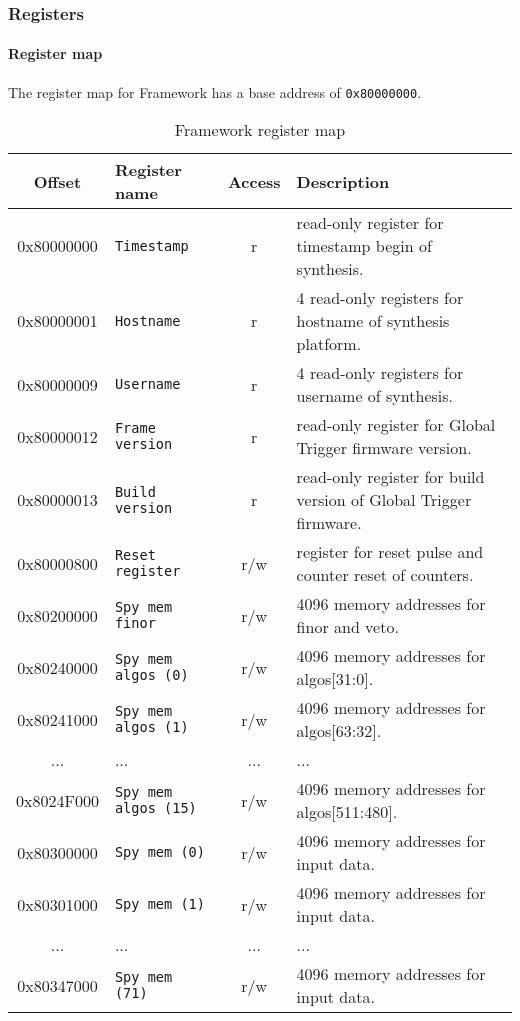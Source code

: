 \subsubsection{Registers}
\label{sec:framework:registers}

\paragraph{Register map}
\label{sec:framework:reg_map}
The register map for Framework has a base address of \verb|0x80000000|.

\begin{longtable}{c p{} c p{}}
\caption{Framework register map}\\
\hline
Offset & Register name & Access & Description\\
\hline
\hline
\endhead
0x80000000 & \verb|Timestamp| & r & read-only register for timestamp begin of synthesis.\\
0x80000001 & \verb|Hostname| & r & 4 read-only registers for hostname of synthesis platform.\\
0x80000009 & \verb|Username| & r & 4 read-only registers for username of synthesis.\\
0x80000012 & \verb|Frame version| & r & read-only register for Global Trigger firmware version.\\
0x80000013 & \verb|Build version| & r & read-only register for build version of Global Trigger firmware.\\
0x80000800 & \verb|Reset register| & r/w & register for reset pulse and counter reset of counters.\\
0x80200000 & \verb|Spy mem finor| & r/w & 4096 memory addresses for finor and veto.\\
0x80240000 & \verb|Spy mem algos (0)| & r/w & 4096 memory addresses for algos[31:0].\\
0x80241000 & \verb|Spy mem algos (1)| & r/w & 4096 memory addresses for algos[63:32].\\
... & ... & ... & ...\\
0x8024F000 & \verb|Spy mem algos (15)| & r/w & 4096 memory addresses for algos[511:480].\\
0x80300000 & \verb|Spy mem (0)| & r/w & 4096 memory addresses for input data.\\
0x80301000 & \verb|Spy mem (1)| & r/w & 4096 memory addresses for input data.\\
... & ... & ... & ...\\
0x80347000 & \verb|Spy mem (71)| & r/w & 4096 memory addresses for input data.\\

\end{longtable}
